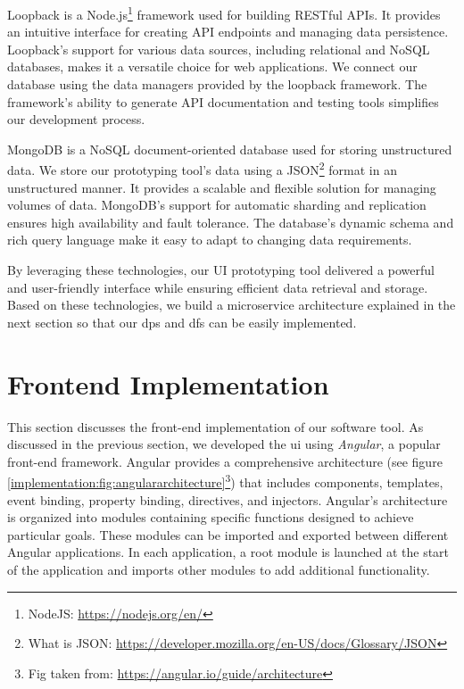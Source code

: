Loopback is a Node.js\footnote{NodeJS: \url{https://nodejs.org/en/}} framework used for building RESTful APIs. 
It provides an intuitive interface for creating API endpoints and managing data persistence. 
Loopback's support for various data sources, including relational and NoSQL databases, makes it a versatile choice for web applications. 
We connect our database using the data managers provided by the loopback framework.
The framework's ability to generate API documentation and testing tools simplifies our development process.

MongoDB is a NoSQL document-oriented database used for storing unstructured data. 
We store our prototyping tool's data using a JSON\footnote{What is JSON: \url{https://developer.mozilla.org/en-US/docs/Glossary/JSON}} format in an unstructured manner.
It provides a scalable and flexible solution for managing volumes of data. 
MongoDB's support for automatic sharding and replication ensures high availability and fault tolerance. 
The database's dynamic schema and rich query language make it easy to adapt to changing data requirements.

By leveraging these technologies, our UI prototyping tool delivered a powerful and user-friendly interface while ensuring efficient data retrieval and storage.
Based on these technologies, we build a microservice architecture explained in the next section so that our \ac{dp}s and \ac{df}s can be easily implemented. 
\clearpage


\section{Frontend Implementation}
\label{implementation:section:frontend}

This section discusses the front-end implementation of our software tool. 
As discussed in the previous section, we developed the \ac{ui} using \textit{Angular}, a popular front-end framework. 
Angular provides a comprehensive architecture (see figure \ref{implementation:fig:angulararchitecture}\footnote{Fig taken from: \url{https://angular.io/guide/architecture}}) that includes components, templates, event binding, property binding, directives, and injectors. 
Angular's architecture is organized into modules containing specific functions designed to achieve particular goals. 
These modules can be imported and exported between different Angular applications. 
In each application, a root module is launched at the start of the application and imports other modules to add additional functionality.

